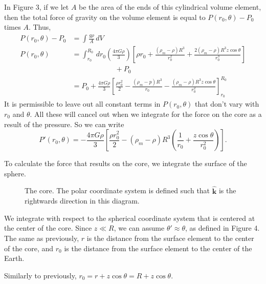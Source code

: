 \documentclass[12pt]{article}
\newcommand{\diff}{\,\textit{d}}
\begin{document}
In Figure 3, if we let $A$ be the area of the ends of this cylindrical volume element, then the total force of gravity on the volume element is equal to $P(r_0,\theta) - P_0$ times $A.$  Thus,
\begin{align*}
	P(r_0,\theta) - P_0 &= \int \frac{g\rho}{A} \diff V \\
	P(r_0,\theta) &= \int_{r_0}^{R_0} \diff r_0 \left( \frac{4\pi G \rho}{3} \right)\left[ \rho r_0 + \frac{(\rho_m - \rho)R^3}{r_0^2} + \frac{2(\rho_m - \rho)R^3 z \cos\theta}{r_0^3} \right]\\
		      & \qquad \qquad \qquad + P_0 \\
		      &= P_0 + \frac{4\pi G \rho}{3}\left[ \frac{\rho r_0^2}{2} - \frac{(\rho_m - p)R^3}{r_0} - \frac{(\rho_m - \rho)R^3 z \cos\theta}{r_0^2} \right]_{r_0}^{R_0}
\end{align*}
It is permissible to leave out all constant terms in $P(r_0,\theta)$ that don't vary with $r_0$ and $\theta$.  All these will cancel out when we integrate for the force on the core as a result of the pressure.  So we can write
\[
	P'(r_0,\theta) = -\frac{4\pi G\rho}{3}\left[ \frac{\rho r_0^2}{2} - (\rho_m - \rho)R^3\left( \frac{1}{r_0} + \frac{z\cos\theta}{r_0^2} \right) \right].
\]

To calculate the force that results on the core, we integrate the surface of the sphere.  

\begin{figure}[ht]
	\centering
	\caption{The core.  The polar coordinate system is defined such that $\hat{\mathbf{k}}$ is the rightwards direction in this diagram.}
\end{figure}

We integrate with respect to the spherical coordinate system that is centered at the center of the core.  Since $z \ll R$, we can assume $\theta' \approx \theta$, as defined in Figure 4.  The same as previously, $r$ is the distance from the surface element to the center of the core, and $r_0$ is the distance from the surface element to the center of the Earth.

Similarly to previously, $r_0 = r + z\cos\theta = R + z\cos\theta.$
\end{document}
